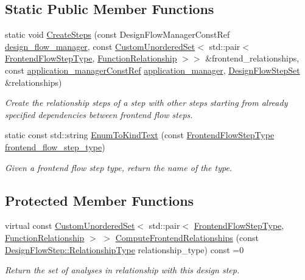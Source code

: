 \subsection*{Static Public Member Functions}
\begin{DoxyCompactItemize}
\item 
static void \hyperlink{classFrontendFlowStep_ad3ca11749bede7a0f026d2cb6c9f6cba}{Create\+Steps} (const Design\+Flow\+Manager\+Const\+Ref \hyperlink{classDesignFlowStep_ab770677ddf087613add30024e16a5554}{design\+\_\+flow\+\_\+manager}, const \hyperlink{classCustomUnorderedSet}{Custom\+Unordered\+Set}$<$ std\+::pair$<$ \hyperlink{frontend__flow__step_8hpp_afeb3716c693d2b2e4ed3e6d04c3b63bb}{Frontend\+Flow\+Step\+Type}, \hyperlink{classFrontendFlowStep_af7cf30f2023e5b99e637dc2058289ab0}{Function\+Relationship} $>$$>$ \&frontend\+\_\+relationships, const \hyperlink{application__manager_8hpp_abb985163a2a3fb747f6f03b1eaadbb44}{application\+\_\+manager\+Const\+Ref} \hyperlink{classapplication__manager}{application\+\_\+manager}, \hyperlink{classDesignFlowStepSet}{Design\+Flow\+Step\+Set} \&relationships)
\begin{DoxyCompactList}\small\item\em Create the relationship steps of a step with other steps starting from already specified dependencies between frontend flow steps. \end{DoxyCompactList}\item 
static const std\+::string \hyperlink{classFrontendFlowStep_ad2069034c4947a128d22f73cf40e17e0}{Enum\+To\+Kind\+Text} (const \hyperlink{frontend__flow__step_8hpp_afeb3716c693d2b2e4ed3e6d04c3b63bb}{Frontend\+Flow\+Step\+Type} \hyperlink{classFrontendFlowStep_ad49067d6a17119d47316149ab757b60d}{frontend\+\_\+flow\+\_\+step\+\_\+type})
\begin{DoxyCompactList}\small\item\em Given a frontend flow step type, return the name of the type. \end{DoxyCompactList}\end{DoxyCompactItemize}
\subsection*{Protected Member Functions}
\begin{DoxyCompactItemize}
\item 
virtual const \hyperlink{classCustomUnorderedSet}{Custom\+Unordered\+Set}$<$ std\+::pair$<$ \hyperlink{frontend__flow__step_8hpp_afeb3716c693d2b2e4ed3e6d04c3b63bb}{Frontend\+Flow\+Step\+Type}, \hyperlink{classFrontendFlowStep_af7cf30f2023e5b99e637dc2058289ab0}{Function\+Relationship} $>$ $>$ \hyperlink{classFrontendFlowStep_abeaff70b59734e462d347ed343dd700d}{Compute\+Frontend\+Relationships} (const \hyperlink{classDesignFlowStep_a723a3baf19ff2ceb77bc13e099d0b1b7}{Design\+Flow\+Step\+::\+Relationship\+Type} relationship\+\_\+type) const =0
\begin{DoxyCompactList}\small\item\em Return the set of analyses in relationship with this design step. \end{DoxyCompactList}\end{DoxyCompactItemize}
